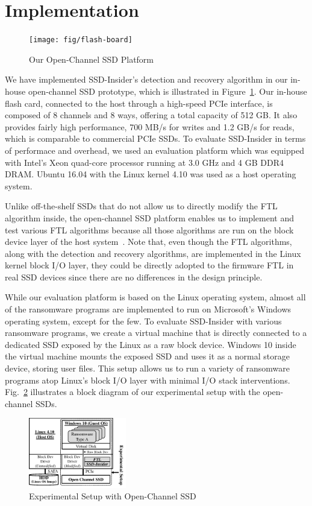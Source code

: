 \documentclass[conference]{IEEEtran}
\newcommand{\ours}{SSD-Insider}
\begin{document}
\section{Implementation}

\begin{figure}[t]
\centering
\texttt{[image: fig/flash-board]}
\caption{Our Open-Channel SSD Platform}
\label{fig:platform}
\end{figure}

We have implemented \ours{}'s
detection and recovery algorithm in our in-house open-channel SSD
prototype, which is illustrated in
Figure~\ref{fig:platform}.  Our in-house flash card, connected to
the host through a high-speed PCIe interface, is composed of 8
channels and 8 ways, offering a total capacity of 512 GB. It also
provides fairly high performance, 700 MB/s for writes and 1.2 GB/s
for reads, which is comparable to commercial PCIe SSDs.  
To evaluate \ours{} in terms of performace and overhead, 
we used an evaluation platform which was equipped
with Intel's Xeon quad-core processor running at 3.0 GHz and 4 GB
DDR4 DRAM. Ubuntu 16.04 with the Linux kernel 4.10 was used as a
host operating system.  

Unlike off-the-shelf SSDs that do not allow us to directly modify
the FTL algorithm inside, the open-channel SSD platform enables us
to implement and test various FTL algorithms because all those
algorithms are run on the block device layer of the host
system~\cite{lightnvm}.  Note that, even though the FTL algorithms, along
with the detection and recovery algorithms, are implemented in the
Linux kernel block I/O layer, they could be directly adopted to the
firmware FTL in real SSD devices since there are no differences in
the design principle.

While our evaluation platform is based on the Linux operating
system, almost all of the ransomware programs are implemented to
run on Microsoft's Windows operating system, except for the few.
To evaluate \ours{} with various ransomware programs, we
create a virtual machine that is directly connected to a dedicated
SSD exposed by the Linux as a raw block device.  Windows 10 inside
the virtual machine mounts the exposed SSD and uses it as a normal
storage device, storing user files. This setup allows us to run a
variety of ransomware programs atop Linux's block I/O layer with
minimal I/O stack interventions. Fig.~\ref{fig:expenv} illustrates a block diagram of our experimental setup with the open-channel SSDs.

\begin{figure}[t]
\centering
\includegraphics[width=0.38\textwidth]{fig/fig-expenv}
\caption{Experimental Setup with Open-Channel SSD}
\label{fig:expenv}
\end{figure}
\end{document}
